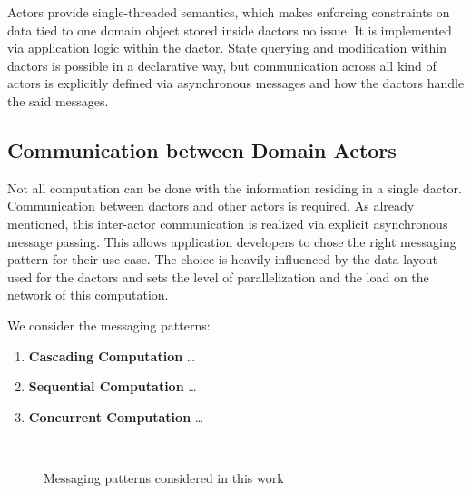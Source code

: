     Actors provide single-threaded semantics, which makes enforcing constraints on data tied to one domain object stored inside \glspl{dactor} no issue.
    It is implemented via application logic within the \gls{dactor}.
    State querying and modification within \glspl{dactor} is possible in a declarative way, but communication across all kind of actors is explicitly defined via asynchronous messages and how the \glspl{dactor} handle the said messages.

  \subsection{Communication between Domain Actors}
    Not all computation can be done with the information residing in a single \gls{dactor}.
    Communication between \glspl{dactor} and other actors is required.
    As already mentioned, this inter-actor communication is realized via explicit asynchronous message passing.
    This allows application developers to chose the right messaging pattern for their use case.
    The choice is heavily influenced by the data layout used for the \glspl{dactor} and sets the level of parallelization and the load on the network of this computation.

    We consider the messaging patterns:
    \begin{enumerate}
      \item\label{enum:comp_pattern_1} \textbf{Cascading Computation} \dots
      \item\label{enum:comp_pattern_2} \textbf{Sequential Computation} \dots
      \item\label{enum:comp_pattern_3} \textbf{Concurrent Computation} \dots
    \end{enumerate}


    \begin{figure}
      \centering

      \begin{subfigure}[c]{0.49\textwidth}
        
        \label{fig:comp_pattern_1}
        \hfill\\
        
        \label{fig:comp_pattern_3}
      \end{subfigure}
      \begin{subfigure}[c]{0.5\textwidth}
        
        \label{fig:comp_pattern_2}
      \end{subfigure}
      \caption{Messaging patterns considered in this work}
      \label{fig:comp_patterns}
    \end{figure}


